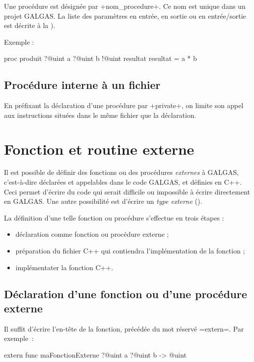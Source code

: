 Une procédure est désignée par \ggst+nom_procedure+. Ce nom est unique dans un projet GALGAS. La liste des paramètres en entrée, en sortie ou en entrée/sortie est décrite à la ).

Exemple :

\begin{galgas3}
proc produit ?@uint a ?@uint b !@uint resultat {
  resultat = a * b
}
\end{galgas3}



\subsection{Procédure interne à un fichier}

En préfixant la déclaration d'une procédure par \ggst+private+, on limite son appel aux instructions situées dans le même fichier que la déclaration.







\section{Fonction et routine externe}

Il est possible de définir des fonctions ou des procédures \emph{externes} à GALGAS, c'est-à-dire déclarées et appelables dans le code GALGAS, et définies en C++. Ceci permet d'écrire du code qui serait difficile ou impossible à écrire directement en GALGAS. Une autre possibilité est d'écrire un \emph{type externe} ().

La définition d'une telle fonction ou procédure s'effectue en trois étapes :
\begin{itemize}
  \item déclaration comme fonction ou procédure externe ;
  \item préparation du fichier C++ qui contiendra l'implémentation de la fonction ;
  \item implémentater la fonction C++.
\end{itemize}

\subsection{Déclaration d'une fonction ou d'une procédure externe}

Il suffit d'écrire l'en-tête de la fonction, précédée du mot réservé \ggst=extern=. Par exemple~:
\begin{galgas3}
extern func maFonctionExterne ?@uint a ?@uint b -> @uint
\end{galgas3}

